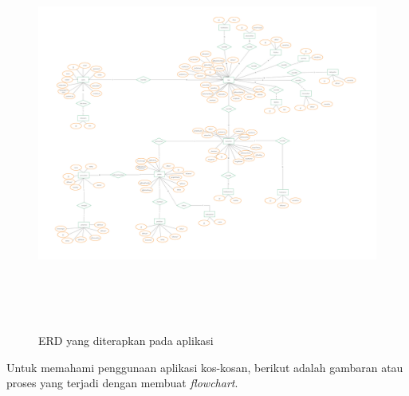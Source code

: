 		\begin{landscape}
			\begin{figure}[H]
				\centering
				\includegraphics [width = 24cm, height= 13cm]{gambar/erd2}
				\caption{ERD yang diterapkan pada aplikasi}
				\label{erd}
			\end{figure}
		\end{landscape}
	
		Untuk memahami penggunaan aplikasi kos-kosan, berikut adalah gambaran atau proses yang terjadi dengan membuat \textit{flowchart}. 
		
